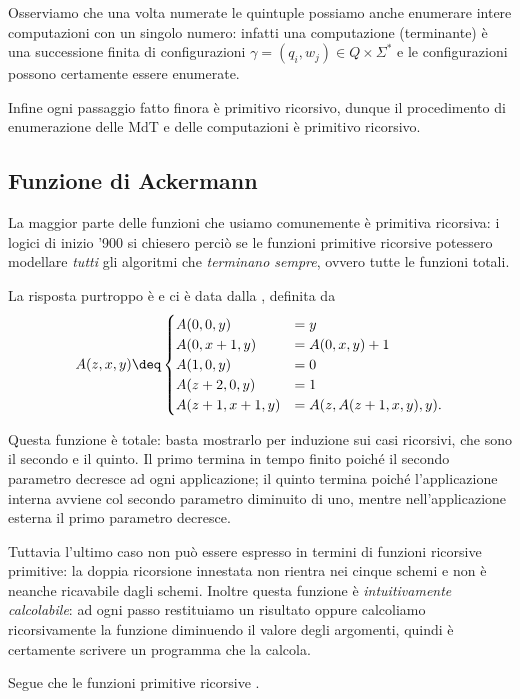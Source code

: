 Osserviamo che una volta numerate le quintuple possiamo anche enumerare intere computazioni con un singolo numero: infatti una computazione (terminante) è una successione finita di configurazioni $\gamma = (q_i, w_j) \in Q \times \Sigma^\ast$ e le configurazioni possono certamente essere enumerate.

Infine ogni passaggio fatto finora è primitivo ricorsivo, dunque il procedimento di enumerazione delle MdT e delle computazioni è primitivo ricorsivo.

\subsection{Funzione di Ackermann}

La maggior parte delle funzioni che usiamo comunemente è primitiva ricorsiva: i logici di inizio '900 si chiesero perciò se le funzioni primitive ricorsive potessero modellare \emph{tutti} gli algoritmi che \emph{terminano sempre}, ovvero tutte le funzioni totali.

La risposta purtroppo è  e ci è data dalla , definita da \[
    A(z, x, y) \deq \begin{cases}
        A(0, 0, y)      &= y\\
        A(0, x+1, y)    &= A(0, x, y) + 1\\
        A(1, 0, y)      &= 0\\
        A(z+2, 0, y)    &= 1\\
        A(z+1, x+1, y)  &= A(z, A(z+1, x, y), y). 
    \end{cases}
\]

Questa funzione è totale: basta mostrarlo per induzione sui casi ricorsivi, che sono il secondo e il quinto. Il primo termina in tempo finito poiché il secondo parametro decresce ad ogni applicazione; il quinto termina poiché l'applicazione interna avviene col secondo parametro diminuito di uno, mentre nell'applicazione esterna il primo parametro decresce.

Tuttavia l'ultimo caso non può essere espresso in termini di funzioni ricorsive primitive: la doppia ricorsione innestata non rientra nei cinque schemi e non è neanche ricavabile dagli schemi.
Inoltre questa funzione è \emph{intuitivamente calcolabile}: ad ogni passo restituiamo un risultato oppure calcoliamo ricorsivamente la funzione diminuendo il valore degli argomenti, quindi è certamente scrivere un programma che la calcola.

Segue che le funzioni primitive ricorsive .

